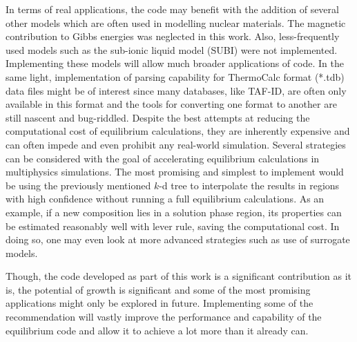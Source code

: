 	In terms of real applications, the code may benefit with the addition of several other models which are often used in modelling nuclear materials. The magnetic contribution to Gibbs energies was neglected in this work. Also, less-frequently used models such as the sub-ionic liquid model (SUBI) were not implemented. Implementing these models will allow much broader applications of code. In the same light, implementation of parsing capability for ThermoCalc format (*.tdb) data files might be of interest since many databases, like TAF-ID, are often only available in this format and the tools for converting one format to another are still nascent and bug-riddled. Despite the best attempts at reducing the computational cost of equilibrium calculations, they are inherently expensive and can often impede and even prohibit any real-world simulation. Several strategies can be considered with the goal of accelerating equilibrium calculations in multiphysics simulations. The most promising and simplest to implement would be using the previously mentioned $k$-d tree to interpolate the results in regions with high confidence without running a full equilibrium calculations. As an example, if a new composition lies in a solution phase region, its properties can be estimated reasonably well with lever rule, saving the computational cost. In doing so, one may even look at more advanced strategies such as use of surrogate models.
	
	Though, the code developed as part of this work is a significant contribution as it is, the potential of growth is significant and some of the most promising applications might only be explored in future. Implementing some of the recommendation will vastly improve the performance and capability of the equilibrium code and allow it to achieve a lot more than it already can.